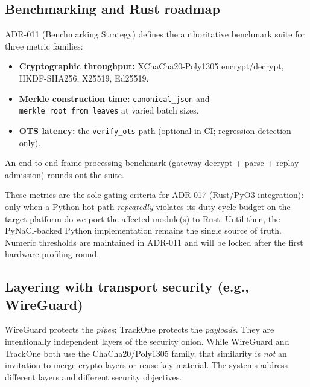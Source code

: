 \subsection{Benchmarking and Rust roadmap}\label{subsec:benchmarking-and-rust-roadmap}
\ac{ADR}-011 (Benchmarking Strategy) defines the authoritative benchmark suite for three metric families:
    \begin{itemize}[nosep]
        \item \textbf{Cryptographic throughput:} XChaCha20-Poly1305 encrypt/decrypt, \ac{HKDF}-\ac{SHA}256, X25519, Ed25519.
        \item \textbf{Merkle construction time:} \texttt{canonical\_json} and \texttt{merkle\_root\_from\_leaves} at varied batch sizes.
        \item \textbf{OTS latency:} the \texttt{verify\_ots} path (optional in \ac{CI}; regression detection only).
    \end{itemize}
An end-to-end frame-processing benchmark (gateway decrypt + parse + replay admission) rounds out the suite.

These metrics are the sole gating criteria for \ac{ADR}-017 (Rust/PyO3 integration):
only when a Python hot path \emph{repeatedly} violates its duty-cycle budget on the target platform
do we port the affected module(s) to Rust.
Until then, the PyNaCl-backed Python implementation remains the single source of truth.
Numeric thresholds are maintained in \ac{ADR}-011 and will be locked after the first hardware profiling round.

\subsection{Layering with transport security (e.g., WireGuard)}
\label{subsec:layering-wireguard}
WireGuard protects the \emph{pipes}; TrackOne protects the \emph{payloads}.
They are intentionally independent layers of the security onion.
While WireGuard and TrackOne both use the ChaCha20/Poly1305 family, that similarity is \emph{not} an invitation to merge crypto layers or reuse key material.
The systems address different layers and different security objectives.

